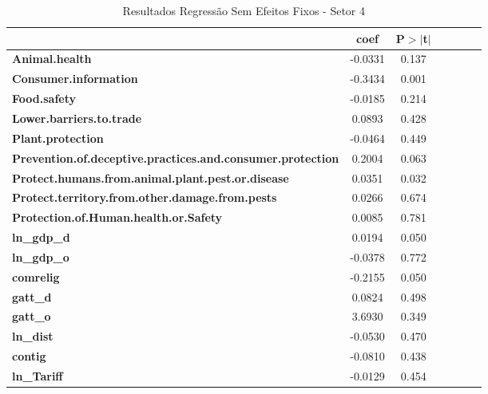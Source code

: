 \begin{table}[ht]
\begin{center}
\begin{tabular}{lcccccc}
        & \textbf{coef} & \textbf{P$> |$t$|$}\\
        \midrule
\textbf{Animal.health}                                             &      -0.0331 &         0.137\\
\textbf{Consumer.information}                                      &      -0.3434 &         0.001\\
\textbf{Food.safety}                                               &      -0.0185 &         0.214\\
\textbf{Lower.barriers.to.trade}                                   &       0.0893 &         0.428\\
\textbf{Plant.protection}                                          &      -0.0464 &         0.449\\
\textbf{Prevention.of.deceptive.practices.and.consumer.protection} &       0.2004 &         0.063\\
\textbf{Protect.humans.from.animal.plant.pest.or.disease}          &       0.0351 &         0.032\\
\textbf{Protect.territory.from.other.damage.from.pests}            &       0.0266 &         0.674\\
\textbf{Protection.of.Human.health.or.Safety}                      &       0.0085 &         0.781\\
\textbf{ln\_gdp\_d}                                                &       0.0194 &         0.050\\
\textbf{ln\_gdp\_o}                                                &      -0.0378 &         0.772\\
\textbf{comrelig}                                                  &      -0.2155 &         0.050\\
\textbf{gatt\_d}                                                   &       0.0824 &         0.498\\
\textbf{gatt\_o}                                                   &       3.6930 &         0.349\\
\textbf{ln\_dist}                                                  &      -0.0530 &         0.470\\
\textbf{contig}                                                    &      -0.0810 &         0.438\\
\textbf{ln\_Tariff}                                                &      -0.0129 &         0.454\\
\bottomrule
\end{tabular}
\caption{Resultados Regressão Sem Efeitos Fixos - Setor 4}
\end{center}
\end{table}